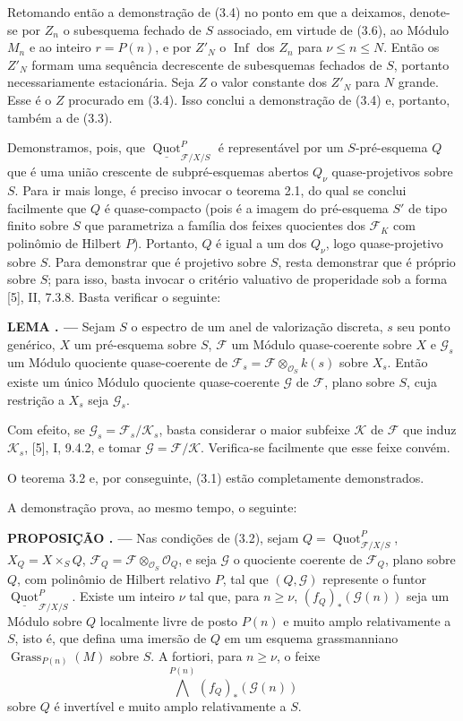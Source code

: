 \documentclass[11pt,twoside,openany]{book}
\numberwithin{equation}{section}
\newcommand{\src}[1]{%
  \phantomsection\hypertarget{src:#1}{}%
  \marginpar{\raggedleft\footnotesize\sffamily #1}%
}
\theoremstyle{plain}
\theoremstyle{definition}
\theoremstyle{remark}
\newcommand{\result}[2]{%
  \par\medskip\noindent\textbf{#1%
  \if\relax\detokenize{#2}\relax\else\space#2\fi. ---}\enspace
}
\newcommand{\FgaUnitKey}{frontmatter}
\renewcommand{\src}[1]{%
  \phantomsection\hypertarget{src:\FgaUnitKey:#1}{}%
  \marginpar{\raggedleft\footnotesize\sffamily #1}%
}
\begin{document}
Retomando então a demonstração de (3.4) no ponto em que a deixamos, denote-se
por $Z_n$ o subesquema fechado de $S$ associado, em virtude de (3.6), ao
Módulo $M_n$ e ao inteiro $r=P(n)$, e por $Z'_N$ o
$\operatorname{Inf}$ dos $Z_n$ para $\nu\leq n\leq N$. Então os $Z'_N$
formam uma sequência decrescente de subesquemas fechados de $S$, portanto
necessariamente estacionária. Seja $Z$ o valor constante dos $Z'_N$ para $N$
grande. Esse é o $Z$ procurado em (3.4). Isso conclui a demonstração de (3.4)
e, portanto, também a de (3.3).

Demonstramos, pois, que
$\underline{\operatorname{Quot}}^P_{\mathcal F/X/S}$ é representável por um
$S$-pré-esquema $Q$ que é uma união crescente de subpré-esquemas abertos
$Q_\nu$ quase-projetivos sobre $S$. Para ir mais longe, é preciso invocar o
teorema 2.1, do qual se conclui facilmente que $Q$ é quase-compacto (pois é a
imagem do pré-esquema $S'$ de tipo finito sobre $S$ que parametriza a família
dos feixes quocientes dos $\mathcal F_K$ com polinômio de Hilbert $P$).
Portanto, $Q$ é igual a um dos $Q_\nu$, logo quase-projetivo sobre $S$. Para
demonstrar que é projetivo sobre $S$, resta demonstrar que é próprio sobre
$S$; para isso, basta invocar o critério valuativo de properidade sob a forma
[5], II, 7.3.8. Basta verificar o seguinte:

\result{LEMA}{3.7} Sejam $S$ o espectro de um anel de valorização discreta,
$s$ seu ponto genérico, $X$ um pré-esquema sobre $S$, $\mathcal F$ um Módulo
quase-coerente sobre $X$ e $\mathcal G_s$ um Módulo quociente quase-coerente
de $\mathcal F_s=\mathcal F\otimes_{\mathcal O_S}k(s)$ sobre $X_s$. Então
existe um único Módulo quociente quase-coerente $\mathcal G$ de $\mathcal F$,
plano sobre $S$, cuja restrição a $X_s$ seja $\mathcal G_s$.
\src{265}
Com efeito, se $\mathcal G_s=\mathcal F_s/\mathcal K_s$, basta considerar o
maior subfeixe $\mathcal K$ de $\mathcal F$ que induz $\mathcal K_s$, [5],
I, 9.4.2, e tomar $\mathcal G=\mathcal F/\mathcal K$. Verifica-se facilmente
que esse feixe convém.

O teorema 3.2 e, por conseguinte, (3.1) estão completamente demonstrados.

A demonstração prova, ao mesmo tempo, o seguinte:

\result{PROPOSIÇÃO}{3.8} Nas condições de (3.2), sejam
$Q=\operatorname{Quot}^P_{\mathcal F/X/S}$, $X_Q=X\times_SQ$,
$\mathcal F_Q=\mathcal F\otimes_{\mathcal O_S}\mathcal O_Q$, e seja
$\mathcal G$ o quociente coerente de $\mathcal F_Q$, plano sobre $Q$, com
polinômio de Hilbert relativo $P$, tal que $(Q,\mathcal G)$ represente o
funtor $\underline{\operatorname{Quot}}^P_{\mathcal F/X/S}$. Existe um
inteiro $\nu$ tal que, para $n\geq\nu$,
$(f_Q)_*(\mathcal G(n))$ seja um Módulo sobre $Q$ localmente livre de posto
$P(n)$ e muito amplo relativamente a $S$, isto é, que defina uma imersão de
$Q$ em um esquema grassmanniano $\operatorname{Grass}_{P(n)}(M)$ sobre $S$.
A fortiori, para $n\geq\nu$, o feixe
\[
\bigwedge^{P(n)}(f_Q)_*(\mathcal G(n))
\]
sobre $Q$ é invertível e muito amplo relativamente a $S$.
\end{document}
